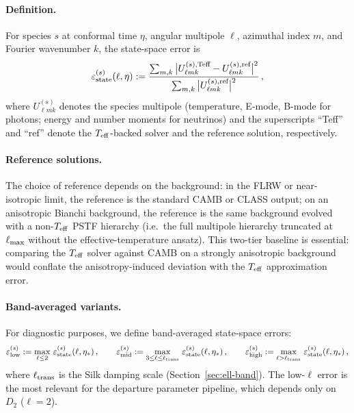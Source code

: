 \paragraph{Definition.}

For species $s$ at conformal time $\eta$, angular multipole
$\ell$, azimuthal index $m$, and Fourier wavenumber $k$, the
state-space error is
\begin{equation}\label{eq:err-state}
\varepsilon_{\rm state}^{(s)}(\ell, \eta)
:= \frac{
  \sum_{m,k}
  \big|
    U_{\ell m k}^{(s),\text{Teff}}
    - U_{\ell m k}^{(s),\text{ref}}
  \big|^2
}{
  \sum_{m,k}
  \big|
    U_{\ell m k}^{(s),\text{ref}}
  \big|^2
}\,,
\end{equation}
where $U_{\ell m k}^{(s)}$ denotes the species multipole
(temperature, E-mode, B-mode for photons; energy and number
moments for neutrinos) and the superscripts ``Teff'' and
``ref'' denote the $T_{\mathrm{eff}}$-backed solver and the reference
solution, respectively.


\paragraph{Reference solutions.}

The choice of reference depends on the background:
in the FLRW or near-isotropic limit, the reference is
the standard CAMB or CLASS output; on an anisotropic
Bianchi background, the reference is the same background
evolved with a non-$T_{\mathrm{eff}}$ PSTF hierarchy (i.e.\ the full
multipole hierarchy truncated at $\ell_{\rm max}$ without
the effective-temperature ansatz).  This two-tier baseline
is essential: comparing the $T_{\mathrm{eff}}$ solver against CAMB on
a strongly anisotropic background would conflate the
anisotropy-induced deviation with the $T_{\mathrm{eff}}$
approximation error.


\paragraph{Band-averaged variants.}

For diagnostic purposes, we define band-averaged
state-space errors:
\begin{equation}\label{eq:err-state-band}
\varepsilon_{\rm low}^{(s)}
:= \max_{\ell \leq 2}\,
  \varepsilon_{\rm state}^{(s)}(\ell, \eta_*)\,,
\qquad
\varepsilon_{\rm mid}^{(s)}
:= \max_{3 \leq \ell \leq \ell_{\rm trans}}\,
  \varepsilon_{\rm state}^{(s)}(\ell, \eta_*)\,,
\qquad
\varepsilon_{\rm high}^{(s)}
:= \max_{\ell > \ell_{\rm trans}}\,
  \varepsilon_{\rm state}^{(s)}(\ell, \eta_*)\,,
\end{equation}
where $\ell_{\rm trans}$ is the Silk damping scale
(Section~\ref{sec:ell-band}).  The low-$\ell$ error is
the most relevant for the departure parameter pipeline,
which depends only on $D_2$ ($\ell = 2$).


